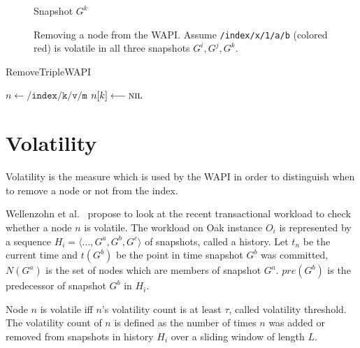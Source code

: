 \documentclass[abstracton,12pt]{scrartcl}
\theoremstyle{definition}
\begin{document}
\begin{figure}[h]
\begin{scriptsize}
\begin{multicols}{3}
\begin{center}
                Snapshot $G^k$
            \end{center}
        \end{multicols}
    \end{scriptsize}
    \caption{Removing a node from the WAPI. Assume \texttt{/index/x/1/a/b} (colored red) is volatile in all three snapshots $G^i, G^j, G^k$.}
    \label{fig:remove_wapi}
\end{figure}

\begin{algorithm}[H]
    \label{algo:remove_triple_wapi}
    \caption{RemoveTripleWAPI}
    \DontPrintSemicolon
    \begin{footnotesize}
        $n \longleftarrow \texttt{/index/k/v/m}$\;
        $n[k] \longleftarrow \textsc{nil}$\;
    \end{footnotesize}
\end{algorithm}

\section{Volatility}
\label{ch:volatility}

Volatility is the measure which is used by the WAPI in order to distinguish when to remove a node or not from the index.

Wellenzohn et al.~\cite{KW17} propose to look at the recent transactional
workload to check whether a node $n$ is volatile. The workload on Oak instance
$O_i$ is represented by a sequence $H_i = \langle \ldots, G^a, G^b, G^c
\rangle$ of snapshots, called a history. Let $t_n$ be the current time and $t(G^b)$
be the point in time snapshot $G^b$ was committed, $N(G^a)$ is the set of
nodes which are members of snapshot $G^a$.  $pre(G^b)$ is the predecessor of
snapshot $G^b$ in $H_i$.

Node $n$ is volatile iff $n$'s volatility count is at least $\tau$, called volatility threshold.
The volatility count of $n$ is defined as the number of times $n$ was added or removed from snapshots in history $H_i$ over a sliding window of length $L$.
\end{document}
